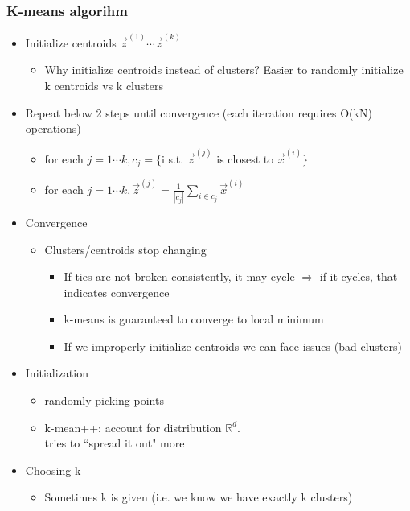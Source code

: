 \documentclass[10pt, oneside]{article}
\newcommand{\R}{\mathbb{R}}
\begin{document}
\subsubsection{K-means algorihm}
\begin{itemize}
    \item Initialize centroids $\vec z^{(1)} \cdots \vec z^{(k)}$
    \begin{itemize}
        \item Why initialize centroids instead of clusters? Easier to randomly initialize k centroids vs k clusters
    \end{itemize}
    \item Repeat below 2 steps until convergence (each iteration requires O(kN) operations)
    \begin{itemize}
        \item for each $j=1\cdots k, c_j=\{$i s.t. $\vec z^{(j)}$ is closest to $\vec x^{(i)}\}$
        \item for each $j=1\cdots k, \vec z^{(j)} = \frac{1}{|c_j|} \sum_{i\in c_j} \vec x^{(i)}$
    \end{itemize}
    \item Convergence
    \begin{itemize}
        \item Clusters/centroids stop changing
        \begin{itemize}
            \item If ties are not broken consistently, it may cycle $\Rightarrow$ if it cycles, that indicates convergence
            \item k-means is guaranteed to converge to local minimum
            \item If we improperly initialize centroids we can face issues (bad clusters)
        \end{itemize}
    \end{itemize}
    \item Initialization
    \begin{itemize}
        \item randomly picking points
        \item k-mean++: account for distribution $\R^d$.\\tries to ``spread it out" more
    \end{itemize}
    \item Choosing k
    \begin{itemize}
        \item Sometimes k is given (i.e. we know we have exactly k clusters)

\end{itemize}
\end{itemize}
\end{document}
